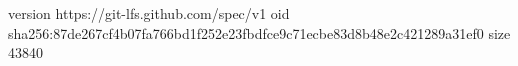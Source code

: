 version https://git-lfs.github.com/spec/v1
oid sha256:87de267cf4b07fa766bd1f252e23fbdfce9c71ecbe83d8b48e2c421289a31ef0
size 43840
